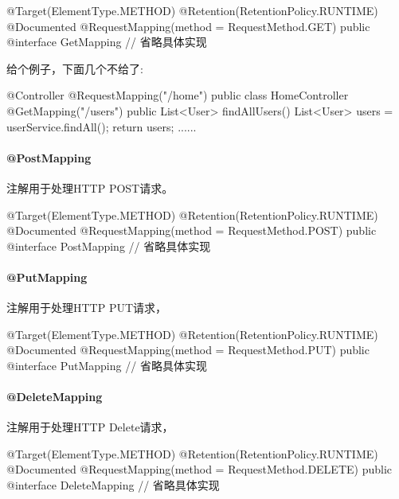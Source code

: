 \begin{Java}
@Target(ElementType.METHOD)
@Retention(RetentionPolicy.RUNTIME)
@Documented
@RequestMapping(method = RequestMethod.GET)
public @interface GetMapping {
    // 省略具体实现
}
\end{Java}

给个例子，下面几个不给了:

\begin{Java}
@Controller
@RequestMapping("/home")
public class HomeController {
    @GetMapping("/users")
    public List<User> findAllUsers() {
        List<User> users = userService.findAll();
        return users;
    }
    ......
}
\end{Java}

\paragraph*{@PostMapping}

注解用于处理HTTP POST请求。

\begin{Java}
@Target(ElementType.METHOD)
@Retention(RetentionPolicy.RUNTIME)
@Documented
@RequestMapping(method = RequestMethod.POST)
public @interface PostMapping {
    // 省略具体实现
}
\end{Java}

\paragraph*{@PutMapping}

注解用于处理HTTP PUT请求，

\begin{Java}
@Target(ElementType.METHOD)
@Retention(RetentionPolicy.RUNTIME)
@Documented
@RequestMapping(method = RequestMethod.PUT)
public @interface PutMapping {
    // 省略具体实现
}
\end{Java}

\paragraph*{@DeleteMapping}

注解用于处理HTTP Delete请求，

\begin{Java}
@Target(ElementType.METHOD)
@Retention(RetentionPolicy.RUNTIME)
@Documented
@RequestMapping(method = RequestMethod.DELETE)
public @interface DeleteMapping {
    // 省略具体实现
}
\end{Java}

